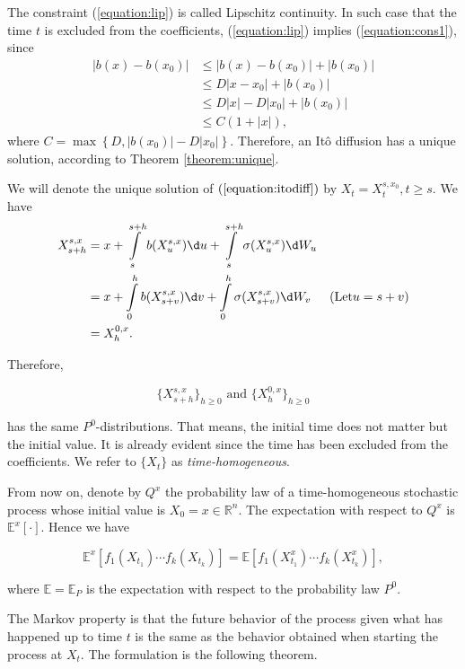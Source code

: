 \begin{remark}
    The constraint (\ref{equation:lip}) is called Lipschitz continuity. In such case that the time $t$ is excluded from the coefficients, (\ref{equation:lip}) implies (\ref{equation:cons1}), since
    \begin{align*}
        |b(x)-b(x_0)| & \le |b(x)-b(x_0)| + |b(x_0)| \\
                      & \le  D|x-x_0| + |b(x_0)|     \\
                      & \le D|x|-D|x_0|+|b(x_0)|     \\
                      & \le C(1+|x|),
    \end{align*}
    where $C=\max\left\{D,|b(x_0)|-D|x_0|\right\}$. Therefore, an Itô diffusion has a unique solution, according to Theorem \ref{theorem:unique}.
\end{remark}

We will denote the unique solution of $(\ref{equation:itodiff})$ by $X_t=X^{s,x_0}_t, t\ge s$. We have
\begin{align*}
    X^{s,x}_{s+h} & = x+\int\limits_{s}^{s+h}b(X_u^{s,x})\d u+\int\limits_{s}^{s+h}\sigma(X_u^{s,x})\d W_u    &                    \\
                  & =x+\int\limits_{0}^{h}b(X_{s+v}^{s,x})\d v+\int\limits_{0}^{h}\sigma(X_{s+v}^{s,x})\d W_v & (\text{Let} u=s+v) \\
                  & = X^{0,x}_h.
\end{align*}

Therefore,

$$\{X_{s+h}^{s,x}\}_{h\ge0} \text{ and } \{X_{h}^{0,x}\}_{h\ge0}$$

has the same $P^0$-distributions. That means, the initial time does not matter but the initial value. It is already evident since the time has been excluded from the coefficients. We refer to $\{X_t\}$ as \textit{time-homogeneous}.

From now on, denote by $Q^x$ the probability law of a time-homogeneous stochastic process whose initial value is $X_0=x\in\mathbb{R}^n$. The expectation with respect to $Q^x$ is $\mathbb{E}^x[\cdot]$. Hence we have

$$\mathbb{E}^x\left[f_1(X_{t_1})\cdots f_k(X_{t_k})\right]=\mathbb{E}\left[f_1(X^x_{t_1})\cdots f_k(X^x_{t_k})\right],$$

where $\mathbb{E}=\mathbb{E}_P$ is the expectation with respect to the probability law $P^0$.

The Markov property is that the future behavior of the process given what has happened up to time $t$ is the
same as the behavior obtained when starting the process at $X_t$. The formulation is the following theorem.

